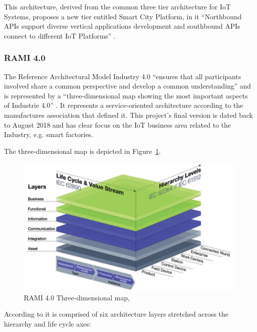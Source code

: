 This architecture, derived from the common three tier architecture for \gls{IoT} Systems, proposes a new tier entitled Smart City Platform, in it ``Northbound APIs support diverse vertical applications development and southbound APIs connect to different IoT Platforms'' \parencite{9032420}.

\subsubsection{RAMI 4.0}
\label{subsubsec:stateofart:arch:rami}

The Reference Architectural Model Industry 4.0 ``ensures that all participants involved share a common perspective and develop a common understanding'' and is represented by a ``three-dimensional map showing the most important aspects of Industrie 4.0'' \parencite{hankel2015reference}. It represents a service-oriented architecture according to the manufactures association that defined it. This project's final version is dated back to August 2018 and has clear focus on the \gls{IoT} business area related to the Industry, e.g. smart factories.

The three-dimensional map is depicted in Figure~\ref{fig:stateofart:arch:rami:map}.

\begin{figure}[H]
    \centering
    \includegraphics[scale=0.4]{
        assets/figures/rami.png
    }
    \caption[RAMI 4.0 Three-dimensional map]{RAMI 4.0 Three-dimensional map, \cite{rami}}
    \label{fig:stateofart:arch:rami:map}
\end{figure}

According to \cite{rami-explained} it is comprised of six architecture layers stretched across the hierarchy and life cycle axes:


